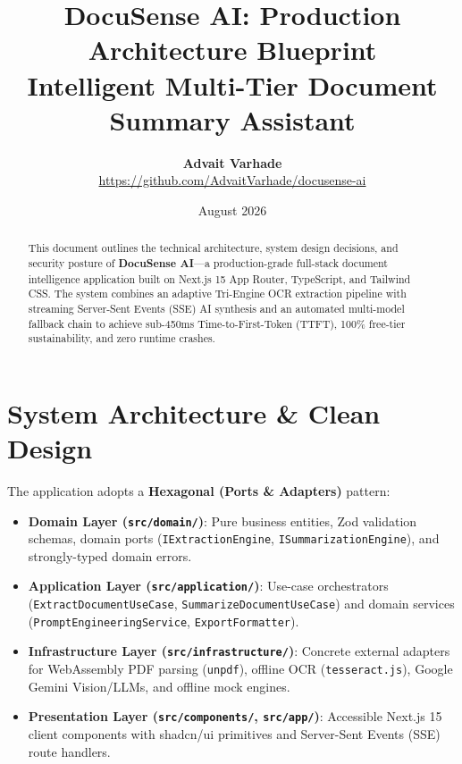 \documentclass[11pt,a4paper]{article}
\title{\textbf{DocuSense AI: Production Architecture Blueprint}\\\large Intelligent Multi-Tier Document Summary Assistant}
\author{\textbf{Advait Varhade}\\\url{https://github.com/AdvaitVarhade/docusense-ai}}
\date{August 2026}
\begin{document}
\maketitle

\begin{abstract}
This document outlines the technical architecture, system design decisions, and security posture of \textbf{DocuSense AI}---a production-grade full-stack document intelligence application built on Next.js 15 App Router, TypeScript, and Tailwind CSS. The system combines an adaptive Tri-Engine OCR extraction pipeline with streaming Server-Sent Events (SSE) AI synthesis and an automated multi-model fallback chain to achieve sub-450ms Time-to-First-Token (TTFT), 100\% free-tier sustainability, and zero runtime crashes.
\end{abstract}

\section{System Architecture \& Clean Design}
The application adopts a \textbf{Hexagonal (Ports \& Adapters)} pattern:
\begin{itemize}[noitemsep]
    \item \textbf{Domain Layer (\texttt{src/domain/})}: Pure business entities, Zod validation schemas, domain ports (\texttt{IExtractionEngine}, \texttt{ISummarizationEngine}), and strongly-typed domain errors.
    \item \textbf{Application Layer (\texttt{src/application/})}: Use-case orchestrators (\texttt{ExtractDocumentUseCase}, \texttt{SummarizeDocumentUseCase}) and domain services (\texttt{PromptEngineeringService}, \texttt{ExportFormatter}).
    \item \textbf{Infrastructure Layer (\texttt{src/infrastructure/})}: Concrete external adapters for WebAssembly PDF parsing (\texttt{unpdf}), offline OCR (\texttt{tesseract.js}), Google Gemini Vision/LLMs, and offline mock engines.
    \item \textbf{Presentation Layer (\texttt{src/components/}, \texttt{src/app/})}: Accessible Next.js 15 client components with shadcn/ui primitives and Server-Sent Events (SSE) route handlers.
\end{itemize}
\end{document}
